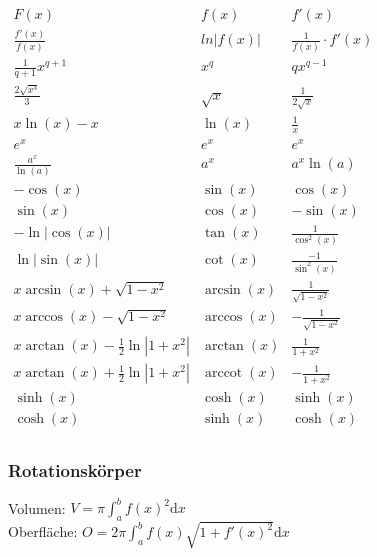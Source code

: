 \documentclass[6pt,a4paper]{scrartcl}
\DeclareMathOperator{\arccot}{arccot}
\begin{document}
\begin{multicols*}{4}
\everymath{\displaystyle}	%
\begin{math}\renewcommand{\arraystretch}{1.8}
\begin{array}{c|c|c}
F(x) & f(x) & f'(x) \\ \hline 
\frac{f'(x)}{f(x)}&ln|f(x)|&\frac{1}{f(x)}\cdot f'(x)\\
\frac{1}{q+1}x^{q+1} & x^q & qx^{q-1} \\
\frac{2\sqrt{x^3}}{3} & \sqrt{x} & \frac{1}{2\sqrt{x}}\\
x\ln(x) -x & \ln(x) & \textstyle \frac{1}{x}\\
e^x & e^x & e^x \\
\frac{a^x}{\ln(a)} & a^x & a^x \ln(a) \\
-\cos(x) & \sin(x) & \cos(x)\\
\sin(x) & \cos(x) & -\sin(x)\\
-\ln |\cos(x)| & \tan(x) & \frac{1}{\cos^2(x)} \\
\ln |\sin(x)| & \cot(x) & \frac{-1}{\sin^2(x)} \\
x\arcsin (x)+\sqrt{1-x^2} & \arcsin(x) & \frac{1}{\sqrt{1-x^2}}\\
x\arccos (x)-\sqrt{1-x^2} & \arccos(x) & -\frac{1}{\sqrt{1-x^2}}\\
x\arctan (x)-\frac{1}{2} \ln \left| 1+ x^2 \right| & \arctan (x) & \frac{1}{1+x^2} \\
x\arctan (x)+\frac{1}{2} \ln \left| 1+ x^2 \right| & \arccot (x) & -\frac{1}{1+x^2} \\
\sinh(x) & \cosh(x) & \sinh (x) \\
\cosh(x) & \sinh(x) & \cosh (x)\\
\end{array}
\end{math}
\everymath{\textstyle}


\subsubsection{Rotationskörper}
Volumen: $V = \pi \int_a^b f(x)^2 \mathrm dx$\\
Oberfläche: $O = 2 \pi \int_a^b f(x) \sqrt{1 + f'(x)^2} \mathrm dx$


\end{multicols*}
\end{document}

